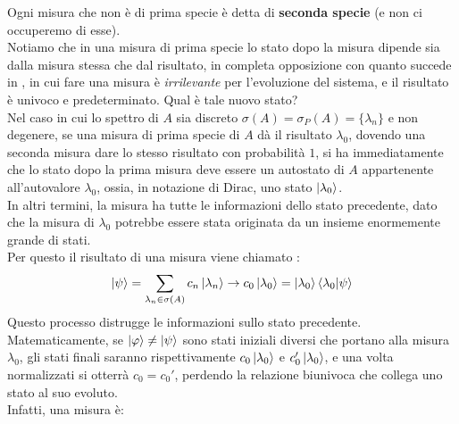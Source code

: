 \documentclass[../../FisicaTeorica.tex]{subfiles}
\begin{document}
Ogni misura che non è di prima specie è detta di \textbf{seconda specie} (e non ci occuperemo di esse).\\
Notiamo che in una misura di prima specie lo stato dopo la misura dipende sia dalla misura stessa che dal risultato, in completa opposizione con quanto succede in \MC, in cui fare una misura è \textit{irrilevante} per l'evoluzione del sistema, e il risultato è univoco e predeterminato. Qual è tale nuovo stato?\\
Nel caso in cui lo spettro di $A$ sia discreto $\sigma(A)=\sigma_P(A) = \{\lambda_n\}$ e non degenere, se una misura di prima specie di $A$ dà il risultato $\lambda_0$, dovendo una seconda misura dare lo stesso risultato con probabilità $1$, si ha immediatamente che lo stato dopo la prima misura deve essere un autostato di $A$ appartenente all'autovalore $\lambda_0$, ossia, in notazione di Dirac, uno stato $\ket{\lambda_0}$.\\
In altri termini, la misura ha  tutte le informazioni dello stato precedente, dato che la misura di $\lambda_0$ potrebbe essere stata originata da un insieme enormemente grande di stati.\\
Per questo il risultato di una misura viene chiamato : 
\[
\ket{\psi} = \sum_{\lambda_n\in \sigma(A)}c_n\ket{\lambda_n}\to c_0 \ket{\lambda_0} = \ket{\lambda_0}\braket{\lambda_0 | \psi}
\] 
Questo processo distrugge le informazioni sullo stato precedente. Matematicamente, se $\ket{\varphi} \neq \ket{\psi}$ sono stati iniziali diversi che portano alla misura $\lambda_0$, gli stati finali saranno rispettivamente $c_0 \ket{\lambda_0}$ e $c_0' \ket{\lambda_0}$, e una volta normalizzati si otterrà $c_0 = c_0'$, perdendo la relazione biunivoca che collega uno stato al suo evoluto.\\
Infatti, una misura è:
\end{document}
